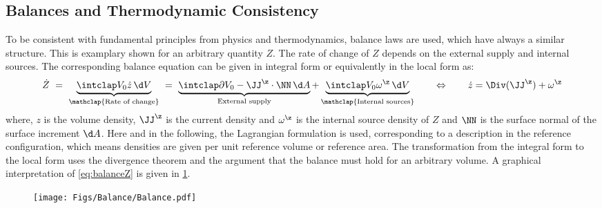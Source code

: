 \subsection{Balances and Thermodynamic Consistency}
To be consistent with fundamental principles from physics and thermodynamics, balance laws are used, which have always a similar structure. This is examplary shown for an arbitrary quantity $Z$. The rate of change of $Z$ depends on the external supply and internal sources. The corresponding balance equation can be given in integral form or equivalently in the local form as:
\begin{align}
  \dot Z  \ = \ \underbrace{ \intVO \dot z \dV}_{\mathclap{\text{Rate of change}}} \ = \ \underbrace{\intdVO -\JJ^{\z} \cdot \NN\dA}_{\text{External supply}} + \underbrace{\intVO \omega^{\z} \dV}_{\mathclap{\text{Internal sources}}} 
  \qquad \Leftrightarrow \qquad \dot z = \Div(\JJ^{\z}) + \omega^{\z}
  \label{eq:balanceZ}
\end{align} 
where, $z$ is the volume density, $\JJ^\z$ is the current density and $\omega^\z$ is the internal source density of $Z$ and $\NN$ is the surface normal of the surface increment $\d A$. Here and in the following, the Lagrangian formulation is used, corresponding to a description in the reference configuration, which means densities are given per unit reference volume or reference area. The transformation from the integral form to the local form uses the divergence theorem and the argument that the balance must hold for an arbitrary volume. A graphical interpretation of \cref{eq:balanceZ} is given in \cref{fig:Balance}.
\begin{figure}[h!]
  \centering
  \texttt{[image: Figs/Balance/Balance.pdf]}
  \caption[]{}
  \label{fig:Balance}
\end{figure}

